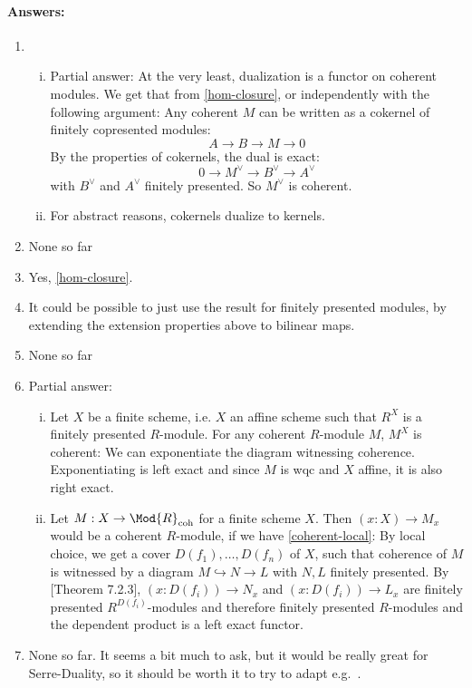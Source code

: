 \paragraph{Answers:}
\begin{enumerate}
\item \begin{enumerate}[(i)]
\item Partial answer: At the very least, dualization is a functor on coherent modules.
We get that from \cref{hom-closure}, or independently with the following argument:
Any coherent $M$ can be written as a cokernel of finitely copresented modules:
\[ A \to B \to M \to 0 \]
By the properties of cokernels, the dual is exact:
\[ 0\to M^\vee \to B^\vee \to A^\vee \]
with $B^\vee$ and $A^\vee$ finitely presented. So $M^\vee$ is coherent.
\item For abstract reasons, cokernels dualize to kernels.
\end{enumerate}
\item None so far
\item Yes, \cref{hom-closure}.
\item It could be possible to just use the result for finitely presented modules, by extending the extension properties above to bilinear maps.
\item None so far
\item Partial answer:
\begin{enumerate}[(i)]
\item Let $X$ be a finite scheme, i.e. $X$ an affine scheme such that $R^X$ is a finitely presented $R$-module.
  For any coherent $R$-module $M$, $M^X$ is coherent: We can exponentiate the diagram witnessing coherence.
  Exponentiating is left exact and since $M$ is wqc and $X$ affine, it is also right exact.
\item Let $M:X\to \Mod{R}_{\mathrm{coh}}$ for a finite scheme $X$. Then $(x:X)\to M_x$ would be a coherent $R$-module, if we have \cref{coherent-local}: By local choice, we get a cover $D(f_1),\dots,D(f_n)$ of $X$, such that coherence of $M$ is witnessed by a diagram $M\hookrightarrow N \to L$ with $N,L$ finitely presented. By \cite{draft}[Theorem 7.2.3], $(x:D(f_i))\to N_x$ and $(x:D(f_i))\to L_x$ are finitely presented $R^{D(f_i)}$-modules and therefore finitely presented $R$-modules and the dependent product is a left exact functor.
\end{enumerate}
\item None so far. It seems a bit much to ask, but it would be really great for Serre-Duality, so it should be worth it to try to adapt e.g.\ \cite[19.1.3]{vakil}.
\end{enumerate}
